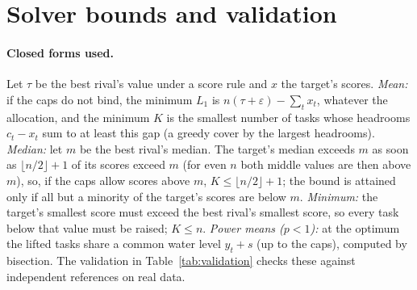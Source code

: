 \section{Solver bounds and validation}
\label{app:bounds}
\paragraph{Closed forms used.}
Let $\tau$ be the best rival's value under a score rule and $x$ the target's scores. \emph{Mean:} if the caps do not bind, the minimum $L_1$ is $n(\tau+\varepsilon)-\sum_t x_t$, whatever the allocation, and the minimum $K$ is the smallest number of tasks whose headrooms $c_t-x_t$ sum to at least this gap (a greedy cover by the largest headrooms). \emph{Median:} let $m$ be the best rival's median. The target's median exceeds $m$ as soon as $\lfloor n/2\rfloor+1$ of its scores exceed $m$ (for even $n$ both middle values are then above $m$), so, if the caps allow scores above $m$, $K\le\lfloor n/2\rfloor+1$; the bound is attained only if all but a minority of the target's scores are below $m$. \emph{Minimum:} the target's smallest score must exceed the best rival's smallest score, so every task below that value must be raised; $K\le n$. \emph{Power means ($p<1$):} at the optimum the lifted tasks share a common water level $y_t+s$ (up to the caps), computed by bisection. The validation in Table~\ref{tab:validation} checks these against independent references on real data.

\begin{table}[h]
\centering
\caption{Validation of the exact solvers (checks are (case, cap, dataset) combinations, not independent instances; error: maximum absolute difference in points, in tasks for $K$).}
\label{tab:validation}
\footnotesize
\resizebox{\textwidth}{!}{}
\end{table}
\begin{table}[h]
\centering
\caption{Data snapshots and numbers of models used.}
\label{tab:validation_data}
\footnotesize
\resizebox{\textwidth}{!}{}
\end{table}


